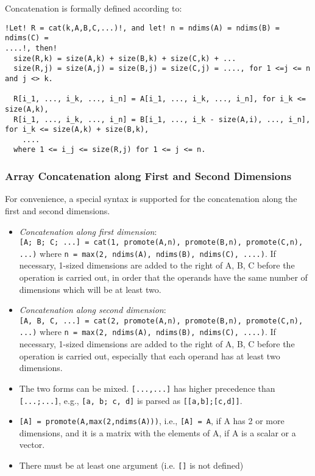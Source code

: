 Concatenation is formally defined according to:
\begin{lstlisting}[language=modelica, escapechar=!]
!Let! R = cat(k,A,B,C,...)!, and let! n = ndims(A) = ndims(B) = ndims(C) =
....!, then!
  size(R,k) = size(A,k) + size(B,k) + size(C,k) + ...
  size(R,j) = size(A,j) = size(B,j) = size(C,j) = ...., for 1 <=j <= n and j <> k.

  R[i_1, ..., i_k, ..., i_n] = A[i_1, ..., i_k, ..., i_n], for i_k <= size(A,k),
  R[i_1, ..., i_k, ..., i_n] = B[i_1, ..., i_k - size(A,i), ..., i_n], for i_k <= size(A,k) + size(B,k),
    ....
  where 1 <= i_j <= size(R,j) for 1 <= j <= n.
\end{lstlisting}


\subsubsection{Array Concatenation along First and Second Dimensions}

For convenience, a special syntax is supported for the concatenation
along the first and second dimensions.

\begin{itemize}
\item
  \emph{Concatenation along first dimension}:\\
\lstinline![A; B; C; ...] = cat(1, promote(A,n), promote(B,n), promote(C,n),  ...)!
where \lstinline!n = max(2, ndims(A), ndims(B), ndims(C), ....)!. If necessary, 1-sized
  dimensions are added to the right of A, B, C before the operation is
  carried out, in order that the operands have the same number of
  dimensions which will be at least two.
\item
  \emph{Concatenation along second dimension}:\\
\lstinline![A, B, C, ...] = cat(2, promote(A,n), promote(B,n), promote(C,n), ...)!
where \lstinline!n = max(2, ndims(A), ndims(B), ndims(C), ....)!. If necessary, 1-sized
  dimensions are added to the right of A, B, C before the operation is
  carried out, especially that each operand has at least two dimensions.
\item
  The two forms can be mixed. \lstinline![...,...]! has higher precedence than
 \lstinline![...;...]!, e.g., \lstinline![a, b; c, d]! is parsed as \lstinline![[a,b];[c,d]]!.
\item
\lstinline![A] = promote(A,max(2,ndims(A)))!, i.e., \lstinline![A] = A!, if A has 2 or
  more dimensions, and it is a matrix with the elements of A, if A is a
  scalar or a vector.
\item
  There must be at least one argument (i.e. \lstinline![]! is not defined)
\end{itemize}

